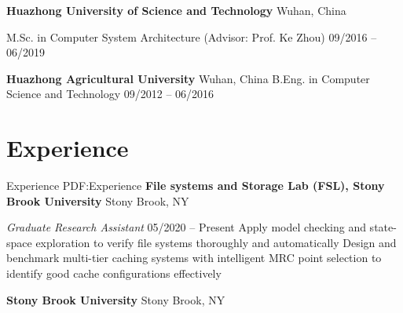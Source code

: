 \documentclass[letterpaper,10pt,oneside]{article}
\begin{document}
\begin{body}
{\textbf{Huazhong University of Science and Technology}}
\hfill
Wuhan, China

\GapNoBreak
\BulletItem
M.Sc. in
{Computer System Architecture} (Advisor: Prof. Ke Zhou)
\hfill
09/2016 -- 06/2019
\begin{detail}
\end{detail}

\BigGap
{\textbf{Huazhong Agricultural University}}
\hfill
Wuhan, China
\GapNoBreak
\BulletItem
B.Eng. in
{Computer Science and Technology}
\hfill
09/2012 -- 06/2016
\begin{detail}
\end{detail}


\section
{Experience}
{Experience}
{PDF:Experience}
{\textbf{File systems and Storage Lab (FSL), Stony Brook University}}
\hfill
Stony Brook, NY

\emph{Graduate Research Assistant}
\hfill
05/2020 --
Present
\GapNoBreak
\BulletItem
Apply model checking and state-space exploration to verify file systems thoroughly and automatically
\GapNoBreak
\BulletItem
Design and benchmark multi-tier caching systems with intelligent MRC point selection to identify good cache configurations effectively

\BigGap
{\textbf{Stony Brook University}}
\hfill
Stony Brook, NY


\end{body}
\end{document}
